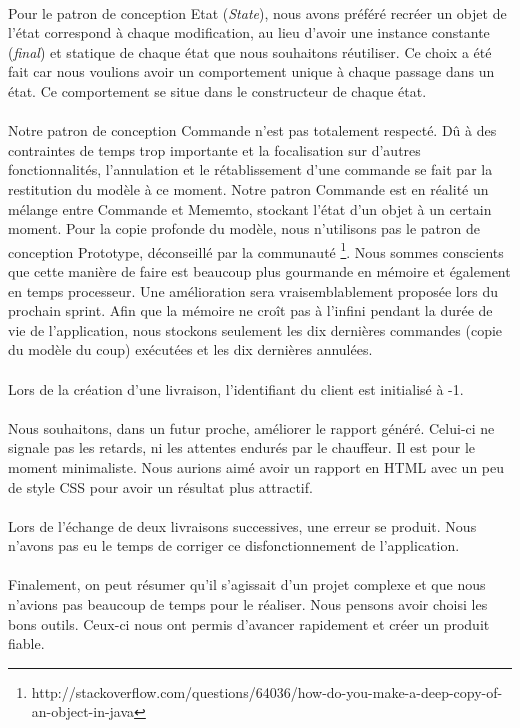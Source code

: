 \documentclass[10pt,a4paper]{book}
\begin{document}
\paragraph{}
Pour le patron de conception Etat (\textit{State}), nous avons préféré recréer un objet de l'état correspond à chaque modification, au lieu d'avoir une instance constante (\textit{final}) et statique de chaque état que nous souhaitons réutiliser. Ce choix a été fait car nous voulions avoir un comportement unique à chaque passage dans un état. Ce comportement se situe dans le constructeur de chaque état.
\paragraph{}
Notre patron de conception Commande n'est pas totalement respecté. Dû à des contraintes de temps trop importante et la focalisation sur d'autres fonctionnalités, l'annulation et le rétablissement d'une commande se fait par la restitution du modèle à ce moment. Notre patron Commande est en réalité un mélange entre Commande et Mememto, stockant l'état d'un objet à un certain moment. Pour la copie profonde du modèle, nous n'utilisons pas le patron de conception Prototype, déconseillé par la communauté \footnote{http://stackoverflow.com/questions/64036/how-do-you-make-a-deep-copy-of-an-object-in-java}. Nous sommes conscients que cette manière de faire est beaucoup plus gourmande en mémoire et également en temps processeur. Une amélioration sera vraisemblablement proposée lors du prochain sprint. Afin que la mémoire ne croît pas à l'infini pendant la durée de vie de l'application, nous stockons seulement les dix dernières commandes (copie du modèle du coup) exécutées et les dix dernières annulées.
\paragraph{}
Lors de la création d'une livraison, l'identifiant du client est initialisé à -1.
\paragraph{}
Nous souhaitons, dans un futur proche, améliorer le rapport généré. Celui-ci ne signale pas les retards, ni les attentes endurés par le chauffeur. Il est pour le moment minimaliste. Nous aurions aimé avoir un rapport en HTML avec un peu de style CSS pour avoir un résultat plus attractif.
\paragraph{}
Lors de l'échange de deux livraisons successives, une erreur se produit. Nous n'avons pas eu le temps de corriger ce disfonctionnement de l'application.

\paragraph{}
Finalement, on peut résumer qu'il s'agissait d'un projet complexe et que nous n'avions pas beaucoup de temps pour le réaliser. Nous pensons avoir choisi les bons outils. Ceux-ci nous ont permis d'avancer rapidement et créer un produit fiable.
\appendix{}
\end{document}
